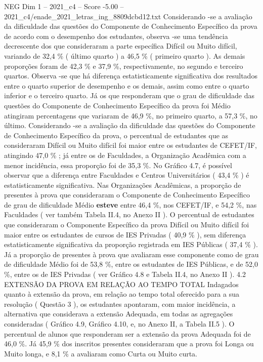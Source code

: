 \begin{textsample}{NEG Dim 1 – 2021\_c4 – Score -5.00 – 2021\_c4/enade\_2021\_letras\_ing\_8809dcbd12.txt}
Considerando -se a avaliação da dificuldade das questões do Componente de Conhecimento Específico da prova de acordo com o desempenho dos estudantes, observa -se uma tendência decrescente dos que consideraram a parte específica Difícil ou Muito difícil, variando de 32,4 \% ( último quarto ) a 46,5 \% ( primeiro quarto ).
As demais proporções foram de 42,3 \% e 37,9 \%, respectivamente, no segundo e terceiro quartos.
Observa -se que há diferença estatisticamente significativa dos resultados entre o quarto superior de desempenho e os demais, assim como entre o quarto inferior e o terceiro quarto.
Já os que responderam que o grau de dificuldade das questões do Componente de Conhecimento Específico da prova foi Médio atingiram percentagens que variaram de 46,9 \%, no primeiro quarto, a 57,3 \%, no último.
Considerando -se a avaliação da dificuldade das questões do Componente de Conhecimento Específico da prova, o percentual de estudantes que as consideraram Difícil ou Muito difícil foi maior entre os estudantes de CEFET/IF, atingindo 47,0 \% ; já entre os de Faculdades, a Organização Acadêmica com a menor incidência, essa proporção foi de 35,3 \%.
No Gráfico 4.7, é possível observar que a diferença entre Faculdades e Centros Universitários ( 43,4 \% ) é estatisticamente significativa.
Nas Organizações Acadêmicas, a proporção de presentes à prova que consideraram o Componente de Conhecimento Específico de grau de dificuldade Médio \textbf{esteve} entre 46,4 \%, nos CEFET/IF, e 54,2 \%, nas Faculdades ( ver também Tabela II.4, no Anexo II ).
O percentual de estudantes que consideraram o Componente Específico da prova Difícil ou Muito difícil foi maior entre os estudantes de cursos de IES Privadas ( 40,9 \% ), sem diferença estatisticamente significativa da proporção registrada em IES Públicas ( 37,4 \% ).
Já a proporção de presentes à prova que avaliaram esse componente como de grau de dificuldade Médio foi de 53,8 \%, entre os estudantes de IES Públicas, e de 52,0 \%, entre os de IES Privadas ( ver Gráfico 4.8 e Tabela II.4, no Anexo II ). 4.2 EXTENSÃO DA PROVA EM RELAÇÃO AO TEMPO TOTAL Indagados quanto à extensão da prova, em relação ao tempo total oferecido para a sua resolução ( Questão 3 ), os estudantes apontaram, com maior incidência, a alternativa que considerava a extensão Adequada, em todas as agregações consideradas ( Gráfico 4.9, Gráfico 4.10, e, no Anexo II, a Tabela II.5 ).
O percentual de alunos que responderam ser a extensão da prova Adequada foi de 46,0 \%.
Já 45,9 \% dos inscritos presentes consideraram que a prova foi Longa ou Muito longa, e 8,1 \% a avaliaram como Curta ou Muito curta.

\end{textsample}
